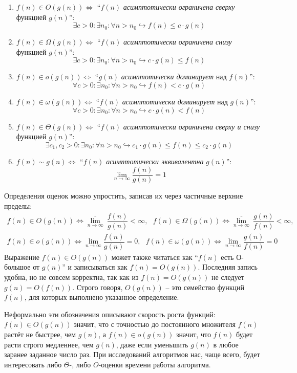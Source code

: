 \documentclass{article}
\begin{document}
\begin{enumerate}
    \item $f(n) \in O(g(n)) \iff $ ``$f(n)$ \textit{асимптотически ограничена сверху} функцией $g(n)$'':
    $$\exists c > 0 : \exists n_0 : \forall n > n_0 \hookrightarrow f(n) \leq c \cdot g(n)$$
    \item $f(n) \in \Omega(g(n)) \iff $ ``$f(n)$ \textit{асимптотически ограничена снизу} функцией $g(n)$'':
    $$\exists c > 0 : \exists n_0 : \forall n > n_0 \hookrightarrow c \cdot g(n) \leq f(n)$$
    \item $f(n) \in o(g(n)) \iff $ ``$g(n)$ \textit{асимптотически доминирует} над $f(n)$'':
    $$\forall c > 0 : \exists n_0 : \forall n > n_0 \hookrightarrow f(n) < c \cdot g(n)$$
    \item $f(n) \in \omega(g(n)) \iff $ ``$f(n)$ \textit{асимптотически доминирует} над $g(n)$'':
    $$\forall c > 0 : \exists n_0 : \forall n > n_0 \hookrightarrow c\cdot g(n) < f(n)$$
    \item $f(n) \in \Theta(g(n)) \iff $ ``$f(n)$ \textit{асимптотически ограничена сверху и снизу} функцией $g(n)$'':
    $$\exists c_1, c_2 > 0 : \exists n_0 : \forall n > n_0 \hookrightarrow c_1 \cdot g(n) \leq f(n) \leq c_2 \cdot g(n)$$
    \item $f(n) \sim g(n) \iff $ ``$f(n)$ \textit{асимптотически эквивалентна} $g(n)$'':
    $$\lim\limits_{n\to\infty}\dfrac{f(n)}{g(n)}=1$$
\end{enumerate}
Определения оценок можно упростить, записав их через частичные верхние пределы:
\begin{gather*}
    f(n) \in O(g(n)) \iff \overline{\lim\limits_{n \to \infty}}~\dfrac{f(n)}{g(n)} < \infty,~~~
    f(n) \in \Omega(g(n)) \iff \overline{\lim\limits_{n \to \infty}}~\dfrac{g(n)}{f(n)} < \infty,\\
    f(n) \in o(g(n)) \iff \lim\limits_{n \to \infty} \dfrac{f(n)}{g(n)} = 0,~~~
    f(n) \in \omega(g(n)) \iff \lim\limits_{n \to \infty} \dfrac{g(n)}{f(n)} = 0
\end{gather*}
Выражение $f(n) \in O(g(n))$ может также читаться как ``$f(n)$ есть О-большое от $g(n)$'' и записываться как $f(n) = O(g(n))$. Последняя запись удобна, но не совсем корректна, так как из $f(n) = O(g(n))$ не следует $g(n) = O(f(n))$. Строго говоря, $O(g(n))$ -- это семейство функций $f(n)$, для которых выполнено указанное определение.

Неформально эти обозначения описывают скорость роста функций: $f(n) \in O(g(n))$ значит, что с точностью до постоянного множителя $f(n)$ растёт не быстрее, чем $g(n)$, а $f(n) \in o(g(n))$ значит, что $f(n)$ будет расти строго медленнее, чем $g(n)$, даже если уменьшить $g(n)$ в любое заранее заданное число раз. При исследований алгоритмов нас, чаще всего, будет интересовать либо $\Theta$-, либо $O$-оценки времени работы алгоритма. 
\end{document}
